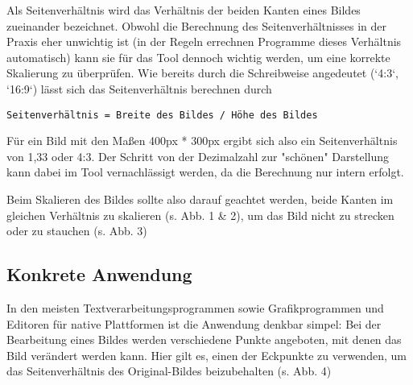 Als Seitenverhältnis wird das Verhältnis der beiden Kanten eines Bildes zueinander bezeichnet. Obwohl die Berechnung des Seitenverhältnisses in der Praxis eher unwichtig ist (in der Regeln errechnen Programme dieses Verhältnis automatisch) kann sie für das Tool dennoch wichtig werden, um eine korrekte Skalierung zu überprüfen.
Wie bereits durch die Schreibweise angedeutet (`4:3`, `16:9`) lässt sich das Seitenverhältnis berechnen durch

\begin{lstlisting}
Seitenverhältnis = Breite des Bildes / Höhe des Bildes
\end{lstlisting}

Für ein Bild mit den Maßen 400px * 300px ergibt sich also ein Seitenverhältnis von 1,33 oder 4:3. Der Schritt von der Dezimalzahl zur "schönen" Darstellung kann dabei im Tool vernachlässigt werden, da die Berechnung nur intern erfolgt.

Beim Skalieren des Bildes sollte also darauf geachtet werden, beide Kanten im gleichen Verhältnis zu skalieren (s. Abb. 1 \& 2), um das Bild nicht zu strecken oder zu stauchen (s. Abb. 3)






\subsection{Konkrete Anwendung}
In den meisten Textverarbeitungsprogrammen sowie Grafikprogrammen und Editoren für native Plattformen ist die Anwendung denkbar simpel: Bei der Bearbeitung eines Bildes werden verschiedene Punkte angeboten, mit denen das Bild verändert werden kann. Hier gilt es, einen der Eckpunkte zu verwenden, um das Seitenverhältnis des Original-Bildes beizubehalten (s. Abb. 4)


